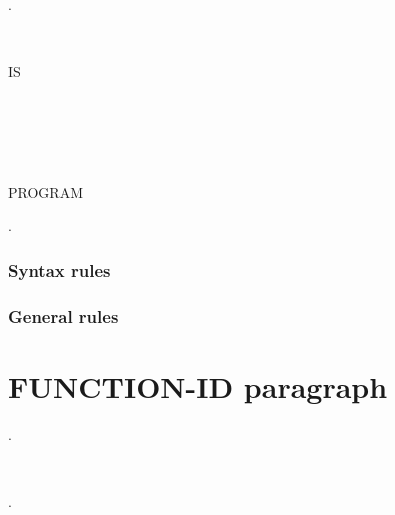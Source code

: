 \begin{syntax}
  .
  \begin{1=}
     \\
    \literal
  \end{1=}
  \begin{0-1}  \literal \end{0-1}

  \begin{0-1} IS
    \begin{1=}
      \begin{1+}
         \\

        \begin{1=}
           \\
           \\
        \end{1=}
      \end{1+}
      PROGRAM \\

    \end{1=}
  \end{0-1}.
\end{syntax}

\subsubsection{Syntax rules}

\subsubsection{General rules}

\section{FUNCTION-ID paragraph}

\begin{syntax}
  .
  \begin{1=}
    \functionname \\
    \literal
  \end{1=}
  \begin{0-1}  \literal \end{0-1}.
\end{syntax}

